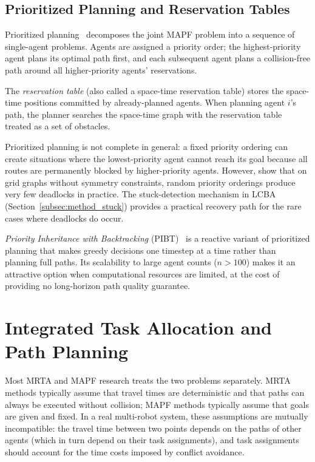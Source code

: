       \subsection{Prioritized Planning and Reservation Tables}
      \label{subsec:bg_prioritized}

      Prioritized planning~\cite{silver2005cooperative} decomposes the joint MAPF
problem into a sequence of single-agent problems.
Agents are assigned a priority order; the highest-priority agent plans its
optimal path first, and each subsequent agent plans a collision-free path
around all higher-priority agents' reservations.

The \emph{reservation table} (also called a space-time reservation table)
stores the space-time positions committed by already-planned agents.
When planning agent $i$'s path, the planner searches the space-time graph
with the reservation table treated as a set of obstacles.

      Prioritized planning is not complete in general: a fixed priority ordering can
create situations where the lowest-priority agent cannot reach its goal because
all routes are permanently blocked by higher-priority agents.
However, \citet{silver2005cooperative} show that on grid graphs without
symmetry constraints, random priority orderings produce very few deadlocks in
practice.
The stuck-detection mechanism in LCBA (Section~\ref{subsec:method_stuck})
provides a practical recovery path for the rare cases where deadlocks do occur.

\emph{Priority Inheritance with Backtracking} (PIBT)~\cite{okumura2019pibt}
      is a reactive variant of prioritized planning that makes greedy decisions
one timestep at a time rather than planning full paths.
Its scalability to large agent counts ($n > 100$) makes it an attractive option
when computational resources are limited, at the cost of providing no
long-horizon path quality guarantee.


\section{Integrated Task Allocation and Path Planning}
\label{sec:bg_integrated}

Most MRTA and MAPF research treats the two problems separately.
MRTA methods typically assume that travel times are deterministic and that
paths can always be executed without collision; MAPF methods typically assume
that goals are given and fixed.
In a real multi-robot system, these assumptions are mutually incompatible:
the travel time between two points depends on the paths of other agents (which
in turn depend on their task assignments), and task assignments should account
for the time costs imposed by conflict avoidance.

